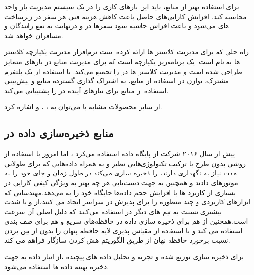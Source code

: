 برای استفاده بهتر از منابع، باید این بارهای کاری را در یک سیستم مدیریت بار واحد محاسبه کند. افزایش کارایی‌های حاصل باعث کاهش هزینه فنی هر سفر در زیرساخت های  می‌شود و باعث افزاش حاشیه سود سفر‌ها در  و درنهایت به نفع رانندگان و مسافران خواهد شد.

راه حلی که  برای مدیریت کلاستر ها ارائه کرده است نرم‌افزار مدیریت یکپارچه کلاستر ها به نام  است\cite{resource_uber}؛  یک برنامه‌ریز یکپارچه است که برای مدیریت منابع در بارهای متمایز طراحی شده است و مدیریت کلاستر ها در  را تجمیع می‌کند.  با استفاده از یک پلتفرم مشترک، توازن در استفاده از منابع، به اشتراک گذاری گسترده منابع و پیش‌بینی استفاده از منابع برای نیازهای آینده در  را پشتیبانی می‌کند.

از سایر محصولات مشابه با  می‌توان به \cite{verma2015large} ،\cite{kubernetes} ، \cite{hadoop} و \cite{aurora}\cite{mesos} اشاره کرد.

\subsection{منابع ذخیره‌سازی داده در }
پیش از سال ۲۰۱۶ شرکت  از پایگاه داده  استفاده می‌کرد \cite{migration_postgres}، اما امروز با استفاده از روشی بدون طرح\cite{schemaless}  با ترکیب تکنولوژی‌هایی نظیر \cite{riak} و \cite{cassandra} به همراه  داده‌هایی که برای طولانی مدت نیاز به نگهداری دارند، را ذخیره سازی می‌کند.در طول زمان  و  جای خود را به موتور‌‌های  دادند و همچنین به جهت دست‌یابی هر چه بهتر به ویژگی کیفی کارایی در بسیاری از کاربرد ها با افزایش حجم داده‌ها  جایگاه خود را به  می‌دهد.مهندسانی که ابزارهای کاربردی و چند منظوره را برای پذیرش در سراسر  ایجاد می کنند،از  و  با شدت بیشتری نسبت به تیم های دیگر در  استفاده می‌کنند که دلیل اصلی آن سرعت است.همچنین  از \cite{redis} هم برای ذخیره سازی داده در حافظه‌های سریع و هم برای صف بندی استفاده می کند و با استفاده از \cite{Twemproxy} مقیاس پذیری لایه حافظه پنهان را بدون از بین بردن نسبت برخورد حافظه نهان از طریق الگوریتم هش کردن سازگار فراهم می کند.

برای ذخیره سازی توزیع شده و تجزیه و تحلیل داده های پیچیده ،از انبار داده \cite{hadoop} به جهت ذخیره بهینه داده ها استفاده می‌شود.

